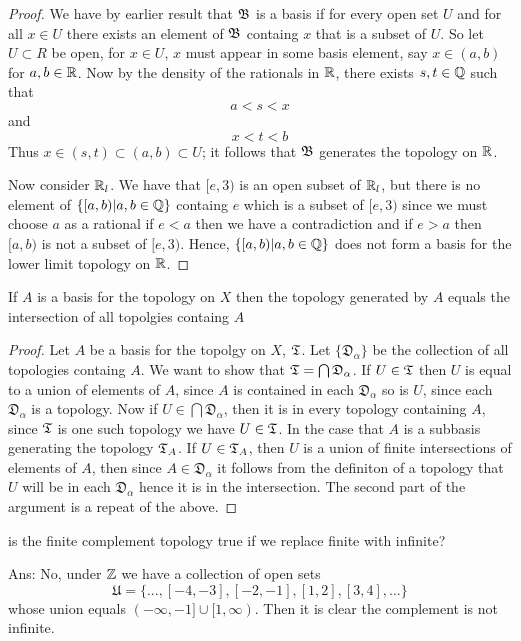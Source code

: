 \begin{proof}
    We have by earlier result that $\mathfrak{B}$ is a basis if for every open set $U$ and for all $x \in U$ there exists an element of $\mathfrak{B}$ 
    containg $x$ that is a subset of $U$. So let $U \subset R$ be open, for $x \in U$, $x$ must appear in some basis element, say $x \in (a, b)$ for $a, b \in \mathbb{R}$. Now by the density of the rationals in $\mathbb{R}$, there exists 
    $s, t \in \mathbb{Q}$ such that 
    \[a < s < x\]
    and 
    \[x < t < b\]
    Thus $x \in (s, t) \subset (a, b) \subset U$; it follows that $\mathfrak{B}$ generates the topology on $\mathbb{R}$. 

    Now consider $\mathbb{R}_l$. We have that $[e, 3)$ is an open subset of $\mathbb{R}_l$, but there is no element of $\{[a, b)| a, b \in \mathbb{Q}\}$ containg $e$ which is a subset 
    of $[e, 3)$ since we must choose $a$ as a rational if $e < a$ then we have a contradiction and if $e > a$ then $[a, b)$ is not a subset of $[e, 3)$. Hence, 
    $\{[a, b)| a, b \in \mathbb{Q}\}$ does not form a basis for the lower limit topology on $\mathbb{R}$.  
\end{proof}


\newpage
\question
If $A$ is a basis for the topology on $X$ then the topology generated by $A$ equals the intersection of all topolgies containg $A$ 


\begin{proof}
    Let $A$ be a basis for the topolgy on $X$, $\mathfrak{T}$. Let $\{ \mathfrak{D}_{\alpha} \}$ be the collection of all topologies containg $A$. 
    We want to show that $\mathfrak{T} = \bigcap \mathfrak{D}_\alpha$. If $U \in \mathfrak{T}$ then $U$ is equal to a union of elements of $A$, since
    $A$ is contained in each $\mathfrak{D}_\alpha$ so is $U$, since each $\mathfrak{D}_\alpha$ is a topology. Now if $U \in \bigcap \mathfrak{D}_\alpha$, 
    then it is in every topology containing $A$, since $\mathfrak{T}$ is one such topology we have $U \in \mathfrak{T}$.  In the case that $A$ is a subbasis generating 
    the topology $\mathfrak{T}_A$. If $U \in \mathfrak{T}_A$, then $U$ is a union of finite intersections of elements of $A$, then since $A \in \mathfrak{D}_\alpha$ it follows 
    from the definiton of a topology that $U$ will be in each $\mathfrak{D}_\alpha$ hence it is in the intersection. The second part of the argument is a repeat of the above. 

\end{proof}



\question 
is the finite complement topology true if we replace finite with infinite? 

Ans: No, under $\mathbb{Z}$ we have a collection of open sets 
\[ \mathfrak{U} = \{ ... , [-4, -3], [-2, -1], [1, 2], [3, 4], ... \}\] 
whose union equals $(-\infty, -1] \cup [1, \infty)$. Then it is clear the complement is not infinite. 

